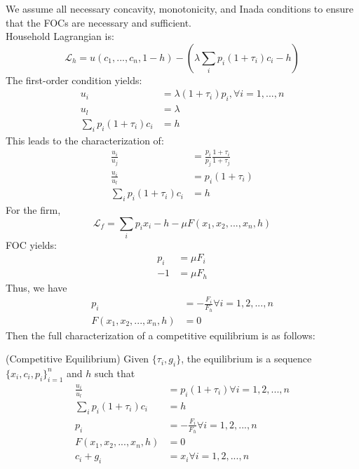 \documentclass[12pt]{article}
\begin{document}
	\noindent
		We assume all necessary concavity, monotonicity, and Inada conditions to ensure that the FOCs are necessary and sufficient.\\
	Household Lagrangian is:
	\begin{equation*}
		\mathcal{L}_h = u(c_1, ..., c_n, 1-h) - (\lambda \sum_{i} p_i(1+\tau_i) c_i - h)
	\end{equation*}
	The first-order condition yields:
	\begin{align}
		u_i &= \lambda (1+\tau_i)p_i, \forall i = 1, ..., n\\
		u_l &= \lambda\\
		\sum_{i} p_i(1+\tau_i) c_i &= h
	\end{align}
	This leads to the characterization of:
	\begin{align}
		\frac{u_i}{u_j} &= \frac{p_i}{p_j}\frac{1 + \tau_i}{1+\tau_j}\\
		\frac{u_i}{u_l} &= p_i(1+\tau_i)\\
		\sum_{i} p_i(1+\tau_i) c_i &= h
	\end{align}
	For the firm,
	\begin{equation*}
		\mathcal{L}_f = \sum_{i} p_i x_i - h - \mu F(x_1, x_2, ..., x_n, h)
	\end{equation*}
	FOC yields:
	\begin{align}
		p_i &= \mu F_i\\
		-1 &= \mu F_h
	\end{align}
	Thus, we have
	\begin{align}
		p_i &= -\frac{F_i}{F_h} \forall i = 1, 2, ..., n\\
		F(x_1, x_2, ..., x_n, h) &= 0
	\end{align}
	Then the full characterization of a competitive equilibrium is as follows:
	\begin{definition} (Competitive Equilibrium)
		Given $\{\tau_i, g_i\}$, the equilibrium is a sequence $\{x_i, c_i, p_i\}_{i=1}^n$ and $h$ such that
		\begin{align}
			\frac{u_i}{u_l} &= p_i(1+\tau_i) \forall i = 1, 2, ..., n \label{eq:static_CE_start}\\
			\sum_{i} p_i(1+\tau_i) c_i &= h \label{eq:static_hhbc}\\
			p_i &= -\frac{F_i}{F_h} \forall i = 1, 2, ..., n \label{eq:mrts_p}\\
			F(x_1, x_2, ..., x_n, h) &= 0 \label{eq:static_prod_copied}\\
			c_i + g_i &= x_i \forall i = 1, 2, ..., n \label{eq:static_CE_end}
		\end{align}
	\end{definition}
	
\end{document}
